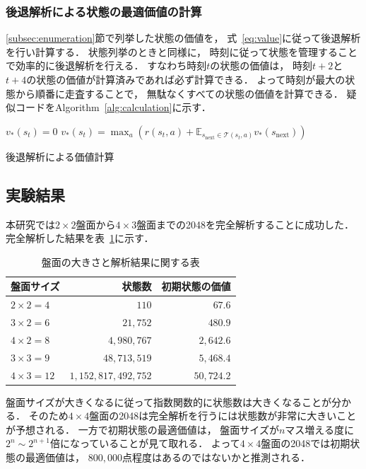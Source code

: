 \subsubsection{後退解析による状態の最適価値の計算}
\label{subsec:calculation}
\ref{subsec:enumeration}節で列挙した状態の価値を， 式~\ref{eq:value}に従って後退解析を行い計算する．
状態列挙のときと同様に， 時刻に従って状態を管理することで効率的に後退解析を行える．
すなわち時刻$t$の状態の価値は， 時刻$t+2$と$t+4$の状態の価値が計算済みであれば必ず計算できる．
よって時刻が最大の状態から順番に走査することで， 無駄なくすべての状態の価値を計算できる．
疑似コードをAlgorithm~\ref{alg:calculation}に示す．
\begin{algorithm}[tb]
    \begin{algorithmic}[1]
                    \State $v_*(s_t) = 0$
                \Else {}
                    \State $v_*(s_t) = \max_a \left(r(s_t,a) + \mathbb{E}_{s_\text{next} \in \mathcal{T}(s_t,a)} v_*(s_\text{next}) \right)$
                \EndIf
            \EndFor
        \EndFor
    \EndFunction
    \end{algorithmic}
    \caption{後退解析による価値計算}
    \label{alg:calculation}
\end{algorithm}

\subsection{実験結果}
本研究では$2\times2$盤面から$4\times3$盤面までの2048を完全解析することに成功した．
完全解析した結果を表~\ref{table: analysis_table}に示す．
\begin{table}[t]
    \centering
    \begin{tabular}{lrr}
        \hline \hline
        盤面サイズ & 状態数 & 初期状態の価値\\ \hline
        $2\times2=4$ & $110$ & $67.6$ \\
        $3\times2=6$ & $21,752$ & $480.9$ \\
        $4\times2=8$ & $4,980,767$ & $2,642.6$ \\
        $3\times3=9$ & $48,713,519$ & $5,468.4$ \\
        $4\times3=12$ & $1,152,817,492,752$ & $50,724.2$ \\
        \hline
    \end{tabular}
    \caption{盤面の大きさと解析結果に関する表}
    \label{table: analysis_table}
\end{table}
盤面サイズが大きくなるに従って指数関数的に状態数は大きくなることが分かる．
そのため$4\times4$盤面の2048は完全解析を行うには状態数が非常に大きいことが予想される．
一方で初期状態の最適価値は， 盤面サイズが$n$マス増える度に$2^n \sim 2^{n+1}$倍になっていることが見て取れる．
よって$4\times4$盤面の2048では初期状態の最適価値は， $800,000$点程度はあるのではないかと推測される．


